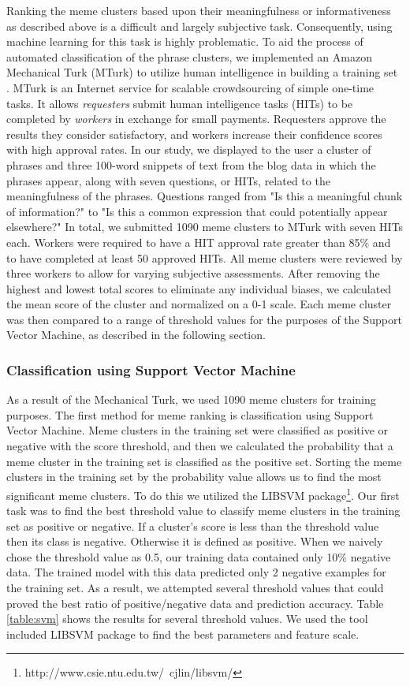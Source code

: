 \documentclass{sig-alternate}
\begin{document}
Ranking the meme clusters based upon their meaningfulness or informativeness as described above is a difficult and largely subjective task. Consequently, using machine learning for this task is highly problematic. To aid the process of automated classification of the phrase clusters, we implemented an Amazon Mechanical Turk (MTurk) to utilize human intelligence in building a training set \cite{Barr&Cabrera2006}. MTurk is an Internet service for scalable crowdsourcing of simple one-time tasks. It allows \emph{requesters} submit human intelligence tasks (HITs) to be completed by \emph{workers} in exchange for small payments. Requesters approve the results they consider satisfactory, and workers increase their confidence scores with high approval rates.
   In our study, we displayed to the user a cluster of phrases and three 100-word snippets of text from the blog data in which the phrases appear, along with seven questions, or HITs, related to the meaningfulness of the phrases. Questions ranged from "Is this a meaningful chunk of information?" to "Is this a common expression that could potentially appear elsewhere?"  In total, we submitted 1090 meme clusters to MTurk with seven HITs each. Workers were required to have a HIT approval rate greater than 85\% and to have completed at least 50 approved HITs.
  All meme clusters were reviewed by three workers to allow for varying subjective assessments.  After removing the highest and lowest total scores to eliminate any individual biases, we calculated the mean score of the cluster and normalized on a 0-1 scale. Each meme cluster was then compared to a range of threshold values for the purposes of the Support Vector Machine, as described in the following section.

\subsubsection{Classification using Support Vector Machine}
As a result of the Mechanical Turk, we used 1090 meme clusters for training purposes. The first method for meme ranking is classification using Support Vector Machine. Meme clusters in the training set were classified as positive or negative with the score threshold, and then we calculated the probability that a meme cluster in the training set is classified as the positive set. Sorting the meme clusters in the training set by the probability value allows us to find the most significant meme clusters. To do this we utilized the LIBSVM package\footnote{http://www.csie.ntu.edu.tw/~cjlin/libsvm/}. Our first task was to find the best threshold value to classify meme clusters in the training set as positive or negative. If a cluster's score is less than the threshold value then its class is negative.  Otherwise it is defined as positive. When we naively chose the threshold value as 0.5, our training data contained only 10\% negative data.   The trained model with this data predicted only 2 negative examples for the training set. As a result, we attempted several threshold values that could proved the best ratio of positive/negative data and prediction accuracy. Table \ref{table:svm} shows the results for several threshold values. We used the tool included LIBSVM package to find the best parameters and feature scale.
\end{document}
